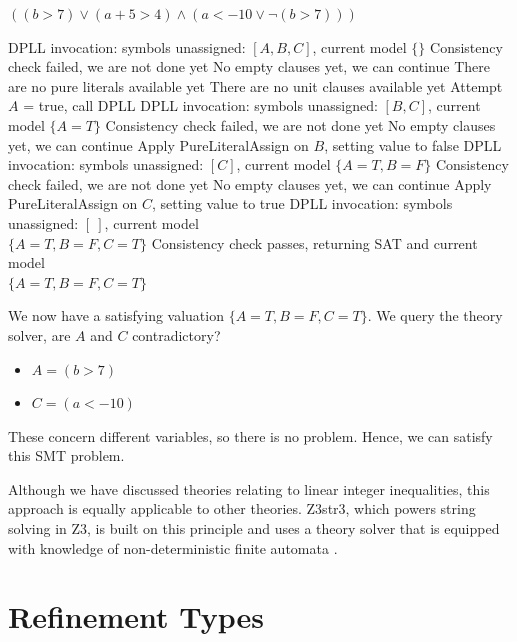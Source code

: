\documentclass[a4paper,openany,12pt]{book}
\begin{document}
\begin{example}{$((b > 7) \lor (a + 5 > 4) \land (a < -10 \lor \neg (b > 7)))$}
    \begin{outline}
        \1[\cogs] DPLL invocation: symbols unassigned: $[A, B, C]$, current model $\{\}$
        \1[\arrow] Consistency check failed, we are not done yet
        \1[\arrow] No empty clauses yet, we can continue
        \1[\arrow] There are no pure literals available yet
        \1[\arrow] There are no unit clauses available yet
        \1[\arrow] Attempt $A$ = true, call DPLL
        \2[\cogs] DPLL invocation: symbols unassigned: $[B, C]$, current model $\{A=T\}$
        \2[\arrow] Consistency check failed, we are not done yet
        \2[\arrow] No empty clauses yet, we can continue
        \2[\arrow] Apply PureLiteralAssign on $B$, setting value to false
        \3[\cogs] DPLL invocation: symbols unassigned: $[C]$, current model $\{A=T, B=F\}$
        \3[\arrow] Consistency check failed, we are not done yet
        \3[\arrow] No empty clauses yet, we can continue
        \3[\arrow] Apply PureLiteralAssign on $C$, setting value to true
        \4[\cogs] DPLL invocation: symbols unassigned: $[~]$, current model\\ $\{A=T, B=F, C=T\}$
        \4[\checkMark] Consistency check passes, returning SAT and current model\\ $\{A=T, B=F, C=T\}$
    \end{outline}

    We now have a satisfying valuation $\{A=T, B=F, C=T\}$.
    We query the theory solver, are $A$ and $C$ contradictory?

    \begin{itemize}
        \item $A = (b > 7)$
        \item $C = (a < -10)$
    \end{itemize}

    These concern different variables, so there is no problem.
    Hence, we can satisfy this SMT problem.
\end{example}



Although we have discussed theories relating to linear integer inequalities, this approach is equally applicable to
other theories.
Z3str3, which powers string solving in Z3, is built on this principle and uses a theory solver that is equipped with
knowledge of non-deterministic finite automata \citep{berzish2017z3str3}.



\section{Refinement Types}
\end{document}
